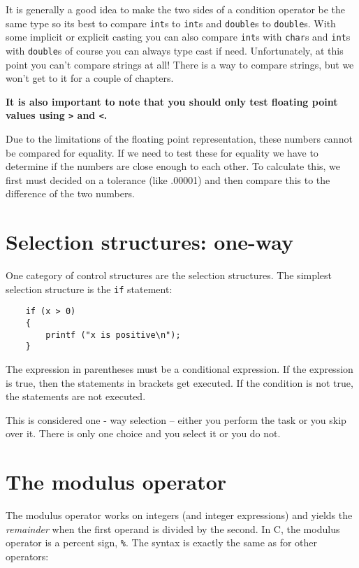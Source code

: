 It is generally a good idea to make the two sides of a condition operator be the same
type so its best to compare {\tt int}s to {\tt int}s and {\tt double}s to {\tt double}s. With some implicit or explicit casting
you can also compare {\tt int}s with {\tt char}s and {\tt int}s with {\tt double}s of course you can always type cast if need.  
 Unfortunately, at this
point you can't compare strings at all!  There is
a way to compare strings, but we won't get to it for a couple
of chapters.

{\bf It is also important to note that you should only test floating point values using {\tt >} and {\tt <}.}

Due to the limitations of the floating point representation, these numbers cannot be compared for equality. 
If we need to test these for equality we have to determine if the numbers are close enough to each other. 
To calculate this, we first must decided on a tolerance (like .00001) and then compare  this to the difference of the two numbers.


\section{Selection structures: one-way} 

One category of control structures are the selection structures. The simplest selection structure is the {\tt if} statement:

\begin{verbatim}
    if (x > 0) 
    {
        printf ("x is positive\n");
    }
\end{verbatim}
%

The expression in parentheses must be a conditional expression.
If the expression is true, then the statements in brackets get executed.
If the condition is not true, the statements are not executed. 


This is considered one - way selection -- either you perform the task or you skip over it. 
There is only one choice and you select it or you do not.

\section{The modulus operator}

The modulus operator works on integers (and integer expressions)
and yields the {\em remainder} when the first operand is divided
by the second.  In C, the modulus operator is a percent sign,
{\tt \%}.  The syntax is exactly the same as for other operators:

